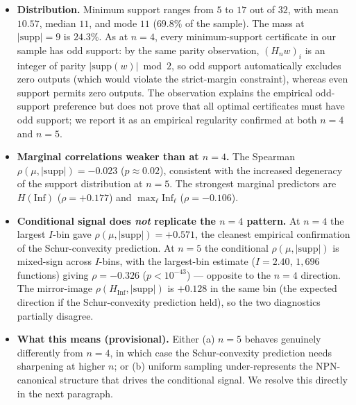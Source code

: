 \documentclass[11pt]{article}
\newcommand{\Inf}{\mathrm{Inf}}
\newcommand{\supp}{\mathrm{supp}}
\begin{document}
\begin{itemize}
    \item \textbf{Distribution.} Minimum support ranges from $5$ to $17$ out of $32$, with mean $10.57$, median $11$, and mode $11$ ($69.8\%$ of the sample). The mass at $|\supp|=9$ is $24.3\%$. As at $n=4$, every minimum-support certificate in our sample has odd support: by the same parity observation, $(H_n w)_i$ is an integer of parity $|\supp(w)| \bmod 2$, so odd support automatically excludes zero outputs (which would violate the strict-margin constraint), whereas even support permits zero outputs. The observation explains the empirical odd-support preference but does not prove that all optimal certificates must have odd support; we report it as an empirical regularity confirmed at both $n=4$ and $n=5$.
    \item \textbf{Marginal correlations weaker than at $n=4$.} The Spearman $\rho(\mu, |\supp|) = -0.023$ ($p \approx 0.02$), consistent with the increased degeneracy of the support distribution at $n=5$. The strongest marginal predictors are $H(\Inf)$ ($\rho = +0.177$) and $\max_\ell \Inf_\ell$ ($\rho = -0.106$).
    \item \textbf{Conditional signal does \emph{not} replicate the $n=4$ pattern.} At $n=4$ the largest $I$-bin gave $\rho(\mu, |\supp|) = +0.571$, the cleanest empirical confirmation of the Schur-convexity prediction. At $n=5$ the conditional $\rho(\mu, |\supp|)$ is mixed-sign across $I$-bins, with the largest-bin estimate ($I = 2.40$, $1{,}696$ functions) giving $\rho = -0.326$ ($p < 10^{-43}$) --- opposite to the $n=4$ direction. The mirror-image $\rho(H_{\Inf}, |\supp|)$ is $+0.128$ in the same bin (the expected direction if the Schur-convexity prediction held), so the two diagnostics partially disagree.
    \item \textbf{What this means (provisional).} Either (a) $n=5$ behaves genuinely differently from $n=4$, in which case the Schur-convexity prediction needs sharpening at higher $n$; or (b) uniform sampling under-represents the NPN-canonical structure that drives the conditional signal. We resolve this directly in the next paragraph.
\end{itemize}
\end{document}
